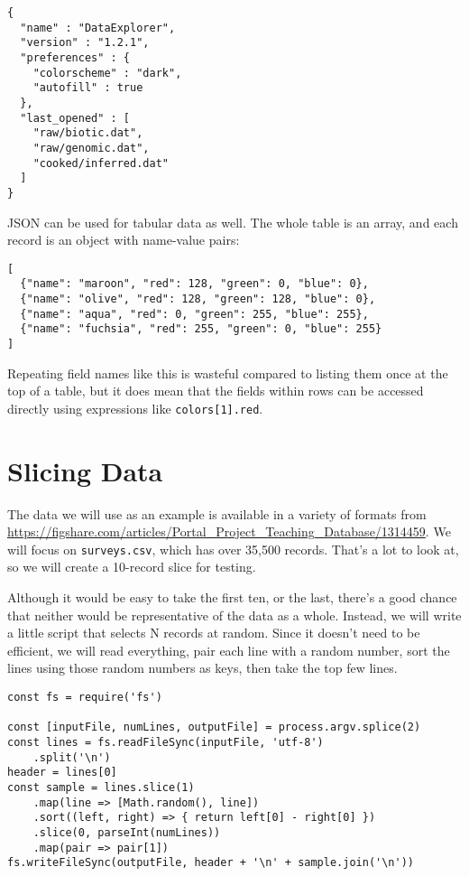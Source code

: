 \begin{verbatim}
{
  "name" : "DataExplorer",
  "version" : "1.2.1",
  "preferences" : {
    "colorscheme" : "dark",
    "autofill" : true
  },
  "last_opened" : [
    "raw/biotic.dat",
    "raw/genomic.dat",
    "cooked/inferred.dat"
  ]
}
\end{verbatim}

JSON can be used for tabular data as well.
The whole table is an array,
and each record is an object with name-value pairs:

\begin{verbatim}
[
  {"name": "maroon", "red": 128, "green": 0, "blue": 0},
  {"name": "olive", "red": 128, "green": 128, "blue": 0},
  {"name": "aqua", "red": 0, "green": 255, "blue": 255},
  {"name": "fuchsia", "red": 255, "green": 0, "blue": 255}
]
\end{verbatim}

Repeating field names like this is wasteful compared to listing them once at the top of a table,
but it does mean that the fields within rows can be accessed directly
using expressions like \texttt{colors[1].red}.

\section{Slicing Data}\label{s:dataman-slicing}

The data we will use as an example is available in a variety of formats
from \url{https://figshare.com/articles/Portal_Project_Teaching_Database/1314459}.
We will focus on \texttt{surveys.csv},
which has over 35,500 records.
That's a lot to look at,
so we will create a 10-record slice for testing.

Although it would be easy to take the first ten,
or the last,
there's a good chance that neither would be representative of the data as a whole.
Instead,
we will write a little script that selects N records at random.
Since it doesn't need to be efficient,
we will read everything,
pair each line with a random number,
sort the lines using those random numbers as keys,
then take the top few lines.

\begin{verbatim}
const fs = require('fs')

const [inputFile, numLines, outputFile] = process.argv.splice(2)
const lines = fs.readFileSync(inputFile, 'utf-8')
    .split('\n')
header = lines[0]
const sample = lines.slice(1)
    .map(line => [Math.random(), line])
    .sort((left, right) => { return left[0] - right[0] })
    .slice(0, parseInt(numLines))
    .map(pair => pair[1])
fs.writeFileSync(outputFile, header + '\n' + sample.join('\n'))
\end{verbatim}

